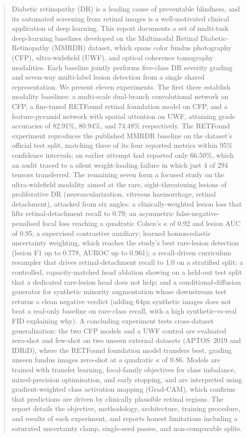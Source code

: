\documentclass[journal,twoside,web]{ieeecolor}
\begin{document}
\begin{abstract}
Diabetic retinopathy (DR) is a leading cause of preventable blindness, and its
automated screening from retinal images is a well-motivated clinical
application of deep learning. This report documents a set of multi-task
deep-learning baselines developed on the Multimodal Retinal Diabetic-Retinopathy
(MMRDR) dataset, which spans color fundus photography (CFP), ultra-widefield
(UWF), and optical coherence tomography modalities. Each baseline jointly
performs five-class DR severity grading and seven-way multi-label lesion
detection from a single shared representation. We present eleven experiments. The
first three establish modality baselines: a multi-scale dual-branch convolutional
network on CFP, a fine-tuned RETFound retinal foundation model on CFP, and a
feature-pyramid network with spatial attention on UWF, attaining grade accuracies
of 82.91\%, 80.94\%, and 74.48\% respectively. The RETFound experiment reproduces
the published MMRDR baseline on the dataset's official test split, matching three
of its four reported metrics within 95\% confidence intervals; an earlier attempt
had reported only 66.50\%, which an audit traced to a silent weight-loading failure
in which just 4 of 294 tensors transferred. The remaining
seven form a focused study on the ultra-widefield modality aimed at the rare,
sight-threatening lesions of proliferative DR (neovascularization, vitreous
haemorrhage, retinal detachment), attacked from six angles: a clinically-weighted
lesion loss that lifts retinal-detachment recall to 0.79; an asymmetric
false-negative-penalised focal loss reaching a quadratic Cohen's $\kappa$ of 0.92
and lesion AUC of 0.95; a supervised contrastive auxiliary; learned homoscedastic
uncertainty weighting, which reaches the study's best rare-lesion detection (lesion
F1 up to 0.778, AUROC up to 0.961); a recall-driven curriculum resampler that
drives retinal-detachment recall to 1.0 on a stratified split; a controlled,
capacity-matched head ablation showing on a held-out test split that a dedicated
rare-lesion head does not help; and a conditional-diffusion generator for synthetic
minority augmentation whose downstream test returns a clean negative verdict (adding
$64$px synthetic images does not beat a real-only baseline on rare-class recall, with
a high synthetic-vs-real FID explaining why). A concluding experiment tests
cross-dataset generalization: the two CFP models and a UWF control are evaluated
zero-shot and few-shot on two unseen external datasets (APTOS~2019 and IDRiD), where
the RETFound foundation model transfers best, grading unseen fundus images zero-shot
at a quadratic $\kappa$ of $0.86$. Models are trained with
transfer learning, focal-family objectives for class imbalance, mixed-precision
optimisation, and early stopping, and are interpreted using gradient-weighted class
activation mapping (Grad-CAM), which confirms that predictions are driven by
clinically plausible retinal regions. The report details the objective,
methodology, architecture, training procedure, and results of each experiment, and
reports honest limitations including a saturated uncertainty clamp, single-seed
passes, and non-comparable splits.
\end{abstract}
\end{document}
